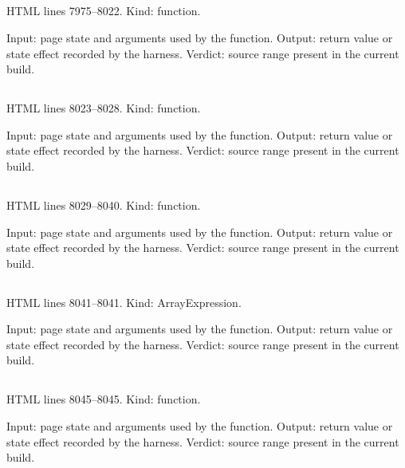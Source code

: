 \subsection*{\texttt{}}
\label{vf_417_appStatusPaint}
HTML lines 7975--8022. Kind: function.

Input: page state and arguments used by the function.
Output: return value or state effect recorded by the harness.
Verdict: source range present in the current build.

\subsection*{\texttt{}}
\label{vf_418_appStatusReport}
HTML lines 8023--8028. Kind: function.

Input: page state and arguments used by the function.
Output: return value or state effect recorded by the harness.
Verdict: source range present in the current build.

\subsection*{\texttt{}}
\label{vf_419_appStatusInit}
HTML lines 8029--8040. Kind: function.

Input: page state and arguments used by the function.
Output: return value or state effect recorded by the harness.
Verdict: source range present in the current build.

\subsection*{\texttt{}}
\label{vf_420_RUNS}
HTML lines 8041--8041. Kind: ArrayExpression.

Input: page state and arguments used by the function.
Output: return value or state effect recorded by the harness.
Verdict: source range present in the current build.

\subsection*{\texttt{}}
\label{vf_421_tag}
HTML lines 8045--8045. Kind: function.

Input: page state and arguments used by the function.
Output: return value or state effect recorded by the harness.
Verdict: source range present in the current build.


